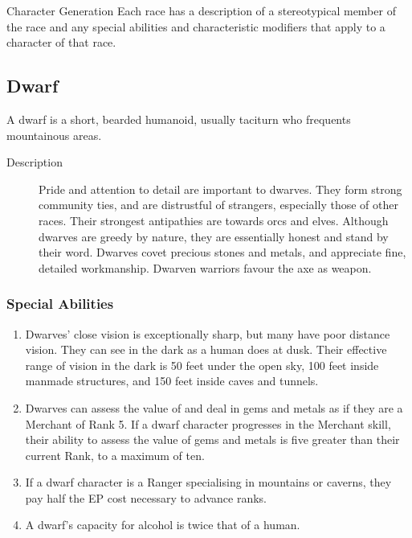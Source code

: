 \begin{Chapter}{Character Generation}
Each race has a description of a stereotypical member of the race and
any special abilities and characteristic modifiers that apply to a
character of that race.

\subsection{Dwarf}

A dwarf is a short, bearded humanoid, usually taciturn who frequents
mountainous areas.

\begin{description}
\item[Description] Pride and attention to detail are important to
  dwarves.  They form strong community ties, and are distrustful of
  strangers, especially those of other races. Their strongest
  antipathies are towards orcs and elves.  Although dwarves are greedy
  by nature, they are essentially honest and stand by their word.
  Dwarves covet precious stones and metals, and appreciate fine,
  detailed workmanship.  Dwarven warriors favour the axe as weapon.
\end{description}

\subsubsection{Special Abilities}

\begin{enumerate}

\item Dwarves’ close vision is exceptionally sharp, but many have poor
  distance vision.  They can see in the dark as a human does at dusk.
  Their effective range of vision in the dark is 50 feet under the
  open sky, 100 feet inside manmade structures, and 150 feet inside
  caves and tunnels.

\item Dwarves can assess the value of and deal in gems and metals as
  if they are a Merchant of Rank 5.  If a dwarf character progresses
  in the Merchant skill, their ability to assess the value of gems and
  metals is five greater than their current Rank, to a maximum of ten.

\item If a dwarf character is a Ranger specialising in mountains or
  caverns, they pay half the EP cost necessary to advance ranks.

\item A dwarf’s capacity for alcohol is twice that of a human.


\end{enumerate}
\end{Chapter}
